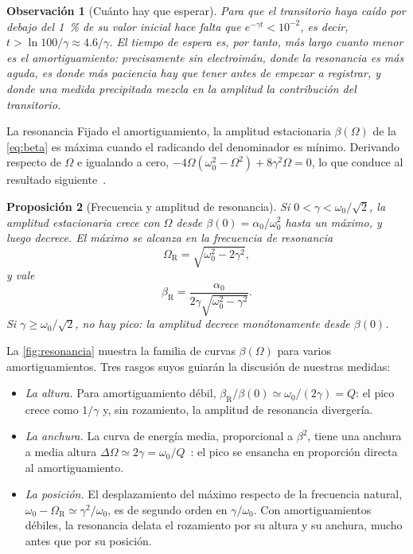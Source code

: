 \documentclass[a4paper,11pt]{amsart}
\makeatletter
\def\subsection{\@startsection{subsection}{2}%
  \z@{.9\linespacing\@plus.6\linespacing}{.3\linespacing}%
  {\normalfont\bfseries\color{azulprof}}}
\numberwithin{equation}{section}
\newcommand{\wz}{\omega_0}                    %
\newcommand{\WR}{\Omega_{\mathrm{R}}}         %
\newcommand{\bR}{\beta_{\mathrm{R}}}          %
\theoremstyle{cienplano}
\newtheorem{proposicion}{Proposición}[section]
\theoremstyle{ciendef}
\theoremstyle{cienobs}
\newtheorem{observacion}[proposicion]{Observación}
\makeatother
\begin{document}
\begin{observacion}[Cuánto hay que esperar]\label{obs:espera}
Para que el transitorio haya caído por debajo del \SI{1}{\percent} de su valor
inicial hace falta que $e^{-\gamma t}<10^{-2}$, es decir, $t>\ln 100/\gamma\approx
4.6/\gamma$. El tiempo de espera es, por tanto, más largo cuanto \emph{menor}
es el amortiguamiento: precisamente sin electroimán, donde la resonancia es más
aguda, es donde más paciencia hay que tener antes de empezar a registrar, y
donde una medida precipitada mezcla en la amplitud la contribución del
transitorio.
\end{observacion}

\subsection{La resonancia}\label{sec:resonancia}
Fijado el amortiguamiento, la amplitud estacionaria $\beta(\Omega)$ de la
\cref{eq:beta} es máxima cuando el radicando del denominador es mínimo.
Derivando respecto de $\Omega$ e igualando a cero,
$-4\Omega(\wz^{2}-\Omega^{2})+8\gamma^{2}\Omega=0$, lo que conduce al
resultado siguiente~\cite{GUION-P4,FIV}.

\begin{proposicion}[Frecuencia y amplitud de resonancia]\label{prop:resonancia}
Si $0<\gamma<\wz/\sqrt2$, la amplitud estacionaria crece con $\Omega$ desde
$\beta(0)=\alpha_0/\wz^{2}$ hasta un máximo, y luego decrece. El máximo se
alcanza en la \emph{frecuencia de resonancia}
\begin{equation}\label{eq:resonancia}
  \WR=\sqrt{\wz^{2}-2\gamma^{2}},
\end{equation}
y vale
\begin{equation}\label{eq:amplitudR}
  \bR=\frac{\alpha_0}{2\gamma\sqrt{\wz^{2}-\gamma^{2}}} .
\end{equation}
Si $\gamma\geq\wz/\sqrt2$, no hay pico: la amplitud decrece monótonamente desde
$\beta(0)$.
\end{proposicion}

La \cref{fig:resonancia} muestra la familia de curvas $\beta(\Omega)$ para
varios amortiguamientos. Tres rasgos suyos guiarán la discusión de nuestras
medidas:
\begin{itemize}
  \item \emph{La altura.} Para amortiguamiento débil,
        $\bR/\beta(0)\simeq\wz/(2\gamma)=Q$: el pico crece como $1/\gamma$ y,
        sin rozamiento, la amplitud de resonancia divergería.
  \item \emph{La anchura.} La curva de energía media, proporcional a
        $\beta^{2}$, tiene una anchura a media altura
        $\Delta\Omega\simeq2\gamma=\wz/Q$~\cite{FIV}: el pico se ensancha en
        proporción directa al amortiguamiento.
  \item \emph{La posición.} El desplazamiento del máximo respecto de la
        frecuencia natural, $\wz-\WR\simeq\gamma^{2}/\wz$, es de segundo orden
        en $\gamma/\wz$. Con amortiguamientos débiles, la resonancia delata el
        rozamiento por su altura y su anchura, mucho antes que por su
        posición.
\end{itemize}
\end{document}

